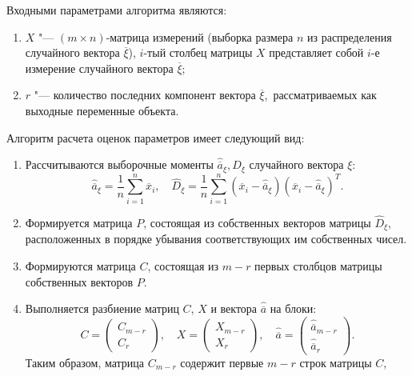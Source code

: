 Входными параметрами алгоритма являются:
\begin{enumerate}
\item \( X \) "--- \( (m \times n) \)-матрица измерений
  (выборка размера \( n \) из распределения случайного вектора \( \overline{\xi} \)),
  \( i \)-тый столбец матрицы \( X \) представляет собой \( i \)-е измерение случайного
  вектора \( \overline{\xi} \);
\item \( r \) "--- количество последних компонент вектора \( \overline{\xi} \),\
  рассматриваемых как выходные переменные объекта.
\end{enumerate}

Алгоритм расчета оценок параметров имеет следующий вид:
\begin{enumerate}
\item Рассчитываются выборочные моменты \( \hat{\overline{a}}_{\xi}, D_{\xi} \) случайного вектора \( \xi \):
  \begin{equation*}
    \hat{\overline{a}}_{\xi} = \dfrac{1}{n} \sum_{i=1}^n \overline{x}_i, \quad
    \hat{D}_{\xi} =
    \dfrac{1}{n}  \sum_{i=1}^n
    (\overline{x}_i - \hat{\overline{a}}_{\xi})
    (\overline{x}_i - \hat{\overline{a}}_{\xi})^T.
  \end{equation*}
\item Формируется матрица \( P \), состоящая из собственных векторов матрицы \( \hat{D}_{\xi} \),
  расположенных в порядке убывания соответствующих им собственных чисел.
\item Формируются матрица \( C \), состоящая из \( m-r \) первых столбцов
  матрицы собственных векторов \( P \).
\item Выполняется разбиение матриц \( C \), \( X \) и вектора \( \hat{\overline{a}} \) на блоки:
  \begin{equation*}
    C =
    \begin{pmatrix}
      C_{m-r} \\
      C_{r}
    \end{pmatrix}, \quad
    X =
    \begin{pmatrix}
      X_{m-r} \\
      X_{r}
    \end{pmatrix}, \quad
    \hat{\overline{a}} =
    \begin{pmatrix}
      \hat{\overline{a}}_{m-r} \\
      \hat{\overline{a}}_{r}
    \end{pmatrix}.
  \end{equation*}
  Таким образом, матрица \( C_{m-r} \)  содержит первые \( m-r \) строк матрицы \( C \),

\end{enumerate}
